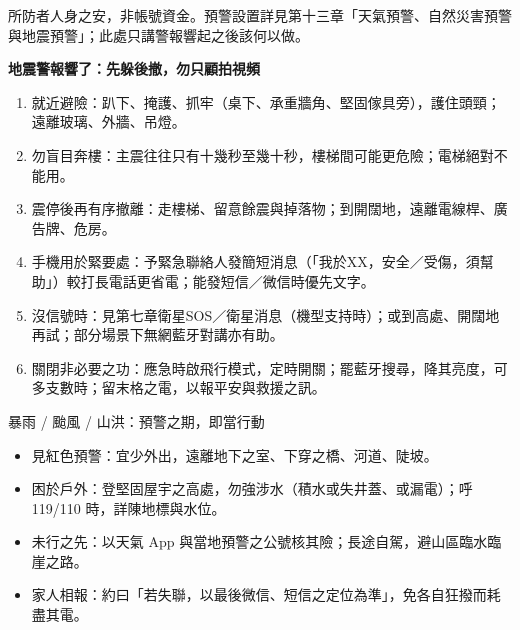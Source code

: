 


所防者人身之安，非帳號資金。預警設置詳見第十三章「天氣預警、自然災害預警與地震預警」；此處只講警報響起之後該何以做。

\textbf{地震警報響了：先躲後撤，勿只顧拍視頻}\par

\begin{enumerate}
  \item 就近避險：趴下、掩護、抓牢（桌下、承重牆角、堅固傢具旁），護住頭頸；遠離玻璃、外牆、吊燈。
  \item 勿盲目奔樓：主震往往只有十幾秒至幾十秒，樓梯間可能更危險；電梯絕對不能用。
  \item 震停後再有序撤離：走樓梯、留意餘震與掉落物；到開闊地，遠離電線桿、廣告牌、危房。
  \item 手機用於緊要處：予緊急聯絡人發簡短消息（「我於XX，安全／受傷，須幫助」）較打長電話更省電；能發短信／微信時優先文字。
  \item 沒信號時：見第七章衛星SOS／衛星消息（機型支持時）；或到高處、開闊地再試；部分場景下無網藍牙對講亦有助。
  \item 關閉非必要之功：應急時啟飛行模式，定時開關；罷藍牙搜尋，降其亮度，可多支數時；留末格之電，以報平安與救援之訊。
\end{enumerate}

\begin{tcbwarn}{暴雨 / 颱風 / 山洪：預警之期，即當行動}
\begin{itemize}
  \item 見紅色預警：宜少外出，遠離地下之室、下穿之橋、河道、陡坡。
  \item 困於戶外：登堅固屋宇之高處，勿強涉水（積水或失井蓋、或漏電）；呼 119/110 時，詳陳地標與水位。
  \item 未行之先：以天氣 App 與當地預警之公號核其險；長途自駕，避山區臨水臨崖之路。
  \item 家人相報：約曰「若失聯，以最後微信、短信之定位為準」，免各自狂撥而耗盡其電。
\end{itemize}

\end{tcbwarn}

